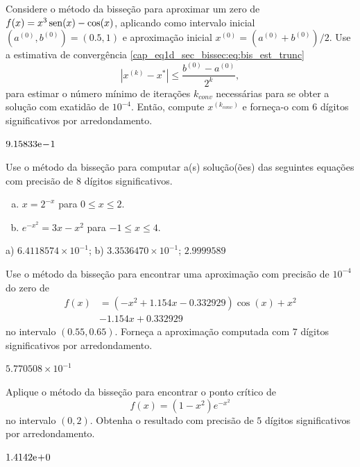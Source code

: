 \begin{exer}
  Considere o método da bisseção para aproximar um zero de $f(x)=x^3\operatorname{sen}(x)-\cos(x)$, aplicando como intervalo inicial $(a^{(0)}, b^{(0)}) = (0.5,  1)$ e aproximação inicial $x^{(0)}=(a^{(0)}+b^{(0)})/2$. Use a estimativa de convergência \eqref{cap_eq1d_sec_bissec:eq:bis_est_trunc}
  \begin{equation}
    \left|x^{(k)} - x^{*}\right| \leq \frac{b^{(0)}-a^{(0)}}{2^k},
  \end{equation}
para estimar o número mínimo de iterações $k_{conv}$ necessárias para se obter a solução com exatidão de $10^{-4}$. Então, compute $x^{(k_{conv})}$ e forneça-o com $6$ dígitos significativos por arredondamento.
\end{exer}
\begin{resp}
  $9.15833\mathrm{e}\!-\!1$
\end{resp}

\begin{exer}
  Use o método da bisseção para computar a(s) solução(ões) das seguintes equações com precisão de 8 dígitos significativos.
  \begin{enumerate}[a)]
  \item $x = 2^{-x}$ para $0\leq x \leq 2$.
  \item $e^{-x^2} = 3x - x^2$ para $-1\leq x\leq 4$.
  \end{enumerate}
\end{exer}
\begin{resp}
  a) $6.4118574\times 10^{-1}$; b) $3.3536470\times 10^{-1}$; $2.9999589$
\end{resp}

\begin{exer}
  Use o método da bisseção para encontrar uma aproximação com precisão de $10^{-4}$ do zero de
  \begin{align}
    f(x) &= (-x^2+1.154x-0.332929)\cos(x) + x^2 \nonumber\\
         &- 1.154x + 0.332929
  \end{align}
no intervalo $(0.55, 0.65)$. Forneça a aproximação computada com $7$ dígitos significativos por arredondamento.
\end{exer}
\begin{resp}
  $5.770508\times 10^{-1}$
\end{resp}

\begin{exer}
  Aplique o método da bisseção para encontrar o ponto crítico de
  \begin{equation}
    f(x) = (1-x^2)e^{-x^2}
  \end{equation}
  no intervalo $(0, 2)$. Obtenha o resultado com precisão de $5$ dígitos significativos por arredondamento.
\end{exer}
\begin{resp}
  $1.4142\mathrm{e}\!+\!0$
\end{resp}

